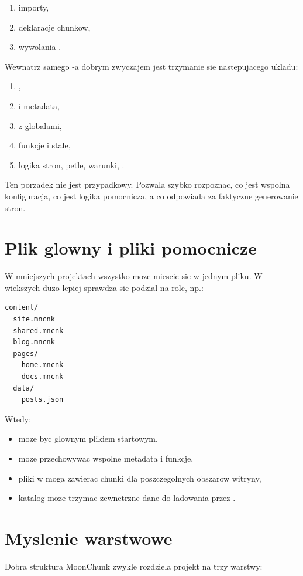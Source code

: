 \begin{enumerate}
  \item importy,
  \item deklaracje chunkow,
  \item wywolania .
\end{enumerate}

Wewnatrz samego -a dobrym zwyczajem jest trzymanie sie nastepujacego ukladu:

\begin{enumerate}
  \item {},
  \item {} i metadata,
  \item {} z globalami,
  \item funkcje i stale,
  \item logika stron, petle, warunki, .
\end{enumerate}

Ten porzadek nie jest przypadkowy. Pozwala szybko rozpoznac, co jest wspolna konfiguracja,
co jest logika pomocnicza, a co odpowiada za faktyczne generowanie stron.

\section{Plik glowny i pliki pomocnicze}
W mniejszych projektach wszystko moze miescic sie w jednym pliku. W wiekszych duzo lepiej
sprawdza sie podzial na role, np.:

\begin{lstlisting}[style=basecode,caption={Przykladowy podzial projektu na pliki}]
content/
  site.mncnk
  shared.mncnk
  blog.mncnk
  pages/
    home.mncnk
    docs.mncnk
  data/
    posts.json
\end{lstlisting}

Wtedy:

\begin{itemize}
  \item {} moze byc glownym plikiem startowym,
  \item {} moze przechowywac wspolne metadata i funkcje,
  \item pliki w  moga zawierac chunki dla poszczegolnych obszarow witryny,
  \item katalog  moze trzymac zewnetrzne dane do ladowania przez .
\end{itemize}

\section{Myslenie warstwowe}
Dobra struktura MoonChunk zwykle rozdziela projekt na trzy warstwy:

